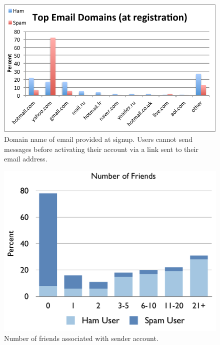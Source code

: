 \documentclass[preprint]{acm_proc_article-sp}
\begin{document}
\begin{figure}[h]
    \centering
    \includegraphics[width=\linewidth]{figures/email.pdf}
    \caption{Domain name of email provided at signup. Users cannot send messages before 
        activating their account via a link sent to their email address.}
    \label{fig:email}
\end{figure}

\begin{figure}[h]
    \centering
    \includegraphics[width=\linewidth]{figures/friends.pdf}
    \caption{Number of friends associated with sender account.}
    \label{fig:friends}
\end{figure}
\end{document}
